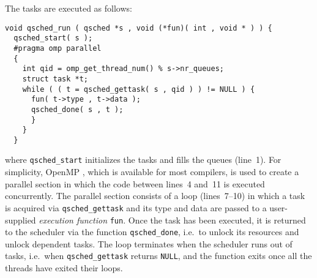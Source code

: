 \documentclass[preprint]{elsarticle}
\begin{document}
The tasks are executed as follows:
\begin{center}\begin{minipage}{0.9\textwidth}
    \begin{lstlisting}
void qsched_run ( qsched *s , void (*fun)( int , void * ) ) {
  qsched_start( s );
  #pragma omp parallel
  {
    int qid = omp_get_thread_num() % s->nr_queues;
    struct task *t;
    while ( ( t = qsched_gettask( s , qid ) ) != NULL ) {
      fun( t->type , t->data );
      qsched_done( s , t );
      }
    }
  }
    \end{lstlisting}
\end{minipage}\end{center}
\noindent where {\tt qsched\_start} initializes the tasks and
fills the queues (line~1).
For simplicity, OpenMP \cite{ref:Dagum1998}, which is available
for most compilers, is used to create a parallel section
in which the code between lines~4 and~11 is executed
concurrently.
The parallel section consists of a loop (lines~7--10) in
which a task is acquired via {\tt qsched\_gettask}
and its type and data are passed to a user-supplied
{\em execution function} {\tt fun}.
Once the task has been executed, it is returned to the
scheduler via the function {\tt qsched\_done}, i.e.~to
unlock its resources and unlock dependent tasks.
The loop terminates when the scheduler runs out of tasks,
i.e.~when {\tt qsched\_gettask} returns {\tt NULL}, and
the function exits once all the threads have exited their
loops.
\end{document}
